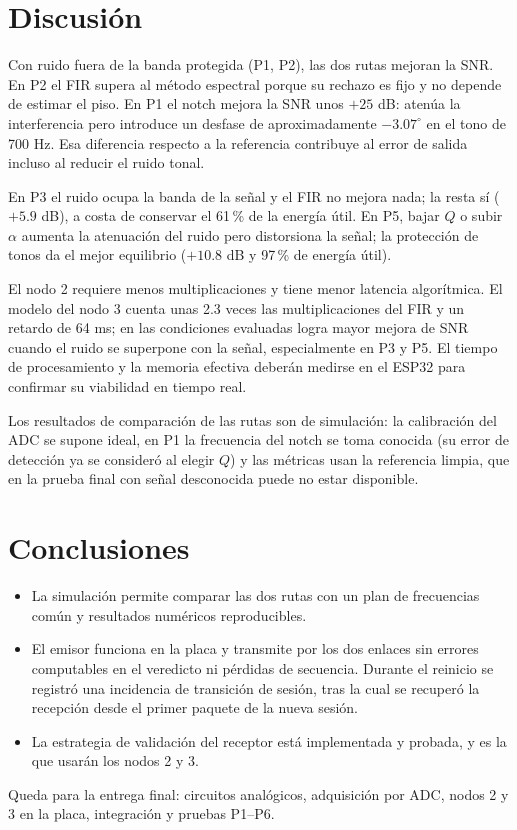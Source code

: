 \documentclass[10pt,a4paper,twocolumn]{article}
\begin{document}
\section{Discusión}
Con ruido fuera de la banda protegida (P1, P2), las dos rutas mejoran la SNR. En P2 el FIR supera al método espectral porque su rechazo es fijo y no depende de estimar el piso. En P1 el notch mejora la SNR unos $+25$ dB: atenúa la interferencia pero introduce un desfase de aproximadamente $-3.07^\circ$ en el tono de 700 Hz. Esa diferencia respecto a la referencia contribuye al error de salida incluso al reducir el ruido tonal.

En P3 el ruido ocupa la banda de la señal y el FIR no mejora nada; la resta sí ($+5.9$ dB), a costa de conservar el 61\,\% de la energía útil. En P5, bajar $Q$ o subir $\alpha$ aumenta la atenuación del ruido pero distorsiona la señal; la protección de tonos da el mejor equilibrio ($+10.8$ dB y 97\,\% de energía útil).

El nodo 2 requiere menos multiplicaciones y tiene menor latencia algorítmica. El modelo del nodo 3 cuenta unas 2.3 veces las multiplicaciones del FIR y un retardo de 64 ms; en las condiciones evaluadas logra mayor mejora de SNR cuando el ruido se superpone con la señal, especialmente en P3 y P5. El tiempo de procesamiento y la memoria efectiva deberán medirse en el ESP32 para confirmar su viabilidad en tiempo real.

Los resultados de comparación de las rutas son de simulación: la calibración del ADC se supone ideal, en P1 la frecuencia del notch se toma conocida (su error de detección ya se consideró al elegir $Q$) y las métricas usan la referencia limpia, que en la prueba final con señal desconocida puede no estar disponible.

\section{Conclusiones}
\begin{itemize}
\item La simulación permite comparar las dos rutas con un plan de frecuencias común y resultados numéricos reproducibles.
\item El emisor funciona en la placa y transmite por los dos enlaces sin errores computables en el veredicto ni pérdidas de secuencia. Durante el reinicio se registró una incidencia de transición de sesión, tras la cual se recuperó la recepción desde el primer paquete de la nueva sesión.
\item La estrategia de validación del receptor está implementada y probada, y es la que usarán los nodos 2 y 3.
\end{itemize}
Queda para la entrega final: circuitos analógicos, adquisición por ADC, nodos 2 y 3 en la placa, integración y pruebas P1--P6.
\end{document}
